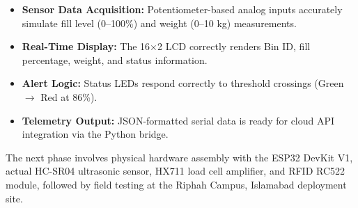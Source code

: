 \documentclass[12pt,a4paper]{article}
\begin{document}
\begin{itemize}[leftmargin=*]
    \item \textbf{Sensor Data Acquisition:} Potentiometer-based analog inputs accurately simulate fill level (0--100\%) and weight (0--10 kg) measurements.
    \item \textbf{Real-Time Display:} The 16$\times$2 LCD correctly renders Bin ID, fill percentage, weight, and status information.
    \item \textbf{Alert Logic:} Status LEDs respond correctly to threshold crossings (Green $\rightarrow$ Red at 86\%).
    \item \textbf{Telemetry Output:} JSON-formatted serial data is ready for cloud API integration via the Python bridge.
\end{itemize}

The next phase involves physical hardware assembly with the ESP32 DevKit V1, actual HC-SR04 ultrasonic sensor, HX711 load cell amplifier, and RFID RC522 module, followed by field testing at the Riphah Campus, Islamabad deployment site.
\end{document}
